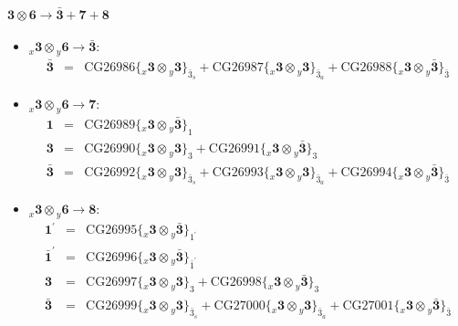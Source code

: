 \documentclass[english]{article}
\newcommand{\rep}[1]{\mathbf{#1}}
\newcommand{\repx}[2]{{}_{#2}\mathbf{#1}}
\newcommand{\subcg}[3]{\big\{ \repx{#1}{x}\otimes\repx{#2}{y}\big\}^{}_{#3}}
\begin{document}
\paragraph*{\Large $\rep{3}\otimes\rep{6}\to\rep{\bar{3}}+\rep{7}+\rep{8}$}
\begin{itemize}
\item $\repx{3}{x}\otimes\repx{6}{y}\to\rep{\bar{3}}$:
\begin{eqnarray*}
\rep{\bar{3}} &=& \text{CG26986}\subcg{3}{3}{\bar{3}_{s}}+\text{CG26987}\subcg{3}{3}{\bar{3}_{a}}+\text{CG26988}\subcg{3}{\bar{3}}{\bar{3}}
\end{eqnarray*}
\item $\repx{3}{x}\otimes\repx{6}{y}\to\rep{7}$:
\begin{eqnarray*}
\rep{1} &=& \text{CG26989}\subcg{3}{\bar{3}}{1}
\\
\rep{3} &=& \text{CG26990}\subcg{3}{3}{3}+\text{CG26991}\subcg{3}{\bar{3}}{3}
\\
\rep{\bar{3}} &=& \text{CG26992}\subcg{3}{3}{\bar{3}_{s}}+\text{CG26993}\subcg{3}{3}{\bar{3}_{a}}+\text{CG26994}\subcg{3}{\bar{3}}{\bar{3}}
\end{eqnarray*}
\item $\repx{3}{x}\otimes\repx{6}{y}\to\rep{8}$:
\begin{eqnarray*}
\rep{1^{\prime}} &=& \text{CG26995}\subcg{3}{\bar{3}}{1^{\prime}}
\\
\rep{\bar{1}^{\prime}} &=& \text{CG26996}\subcg{3}{\bar{3}}{\bar{1}^{\prime}}
\\
\rep{3} &=& \text{CG26997}\subcg{3}{3}{3}+\text{CG26998}\subcg{3}{\bar{3}}{3}
\\
\rep{\bar{3}} &=& \text{CG26999}\subcg{3}{3}{\bar{3}_{s}}+\text{CG27000}\subcg{3}{3}{\bar{3}_{a}}+\text{CG27001}\subcg{3}{\bar{3}}{\bar{3}}
\end{eqnarray*}
\end{itemize}
\end{document}

